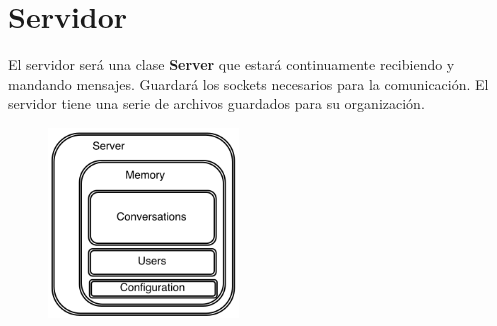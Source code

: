 \section{Servidor}
El servidor será una clase \textbf{Server} que estará continuamente recibiendo y mandando mensajes.
Guardará los sockets necesarios para la comunicación.
El servidor tiene una serie de archivos guardados para su organización.

\vspace{0.1cm}

\begin{figure}[H]
	\centering
	\includegraphics[width=0.45\textwidth]{./Imagenes/server.png}
\end{figure}